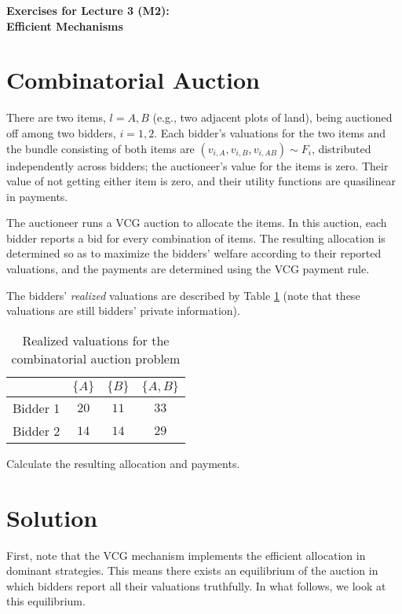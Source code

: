 \documentclass[a4paper]{article}
\newif\ifsolutions
\begin{document}
\begin{center}
		\LARGE\textbf{Exercises for Lecture 3 (M2):\\ Efficient Mechanisms}
\end{center}



\section{Combinatorial Auction}

There are two items, $l=A,B$ (e.g., two adjacent plots of land), being auctioned off among two bidders, $i=1,2$. Each bidder's valuations for the two items and the bundle consisting of both items are $(v_{i,A}, v_{i,B}, v_{i,AB}) \sim F_i$, distributed independently across bidders; the auctioneer's value for the items is zero. Their value of not getting either item is zero, and their utility functions are quasilinear in payments. 

The auctioneer runs a VCG auction to allocate the items. In this auction, each bidder reports a bid for every combination of items. The resulting allocation is determined so as to maximize the bidders' welfare according to their reported valuations, and the payments are determined using the VCG payment rule.

The bidders' \emph{realized} valuations are described by Table \ref{tab:combac} (note that these valuations are still bidders' private information).
\begin{table}[h]
	\begin{center}
		\begin{tabular}{l|c|c|c}
			& $\{A\}$ & $\{B\}$ & $\{A,B\}$  \\ \hline
			Bidder 1 & $20$ & $11$ & $33$ \\
			Bidder 2 & $14$ & $14$ & $29$
		\end{tabular}
	\end{center}
	\caption{Realized valuations for the combinatorial auction problem}
	\label{tab:combac}
\end{table}

Calculate the resulting allocation and payments.

\ifsolutions
\section*{Solution}
	First, note that the VCG mechanism implements the efficient allocation in dominant strategies. This means there exists an equilibrium of the auction in which bidders report all their valuations truthfully. In what follows, we look at this equilibrium.
	
\end{document}
